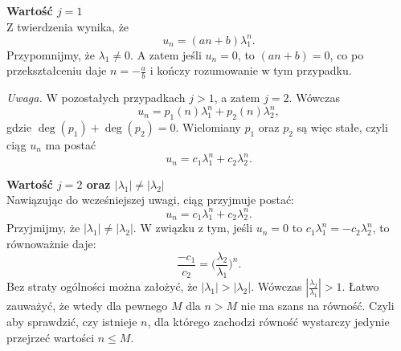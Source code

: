 \documentclass[leqno,10pt]{article}
\begin{document}
\textbf{Wartość $j=1$}\\
Z twierdzenia wynika, że
\[
u_n = (an+b) \lambda_1^n.
\]
Przypomnijmy, że $\lambda_1 \neq 0$.
A zatem jeśli $u_n = 0$, to $(an+b) = 0$, co po przekształceniu daje $n = -\frac{a}{b}$ i kończy rozumowanie w tym przypadku.

\textit{Uwaga.}
W pozostałych przypadkach $j > 1$, a zatem $j = 2$. Wówczas
\[
u_n = p_1(n) \lambda_1^n + p_2(n) \lambda_2^n,
\]
gdzie $\deg(p_1) + \deg(p_2) = 0$. Wielomiany $p_1$ oraz $p_2$ są więc stałe, czyli ciąg $u_n$ ma postać
\[
u_n = c_1 \lambda_1^n + c_2 \lambda_2^n.
\]

\textbf{Wartość $j=2$ oraz $|\lambda_1| \neq |\lambda_2|$}\\
Nawiązując do wcześniejszej uwagi, ciąg przyjmuje postać:
\[
    u_n = c_1 \lambda_1^{n} + c_2 \lambda_{2}^n.
\]
Przyjmijmy, że $|\lambda_1| \neq |\lambda_2|$. W związku z tym, jeśli $u_n = 0$ to $c_1 \lambda_1^n = - c_2 \lambda_2^n$, to równoważnie daje:
\[
    \frac{-c_1}{c_2} = \Big(\frac{\lambda_2}{\lambda_1}\Big)^{n}.
\]
Bez straty ogólności można założyć, że $|\lambda_1|>|\lambda_2|$. Wówczas  $|\frac{\lambda_2}{\lambda_1}| > 1$. 
Łatwo zauważyć, że wtedy dla pewnego $M$ dla $n>M$ nie ma szans na równość. Czyli aby sprawdzić, czy istnieje $n$, dla którego zachodzi równość wystarczy jedynie przejrzeć wartości $n \leq M$.



 

\end{document}
